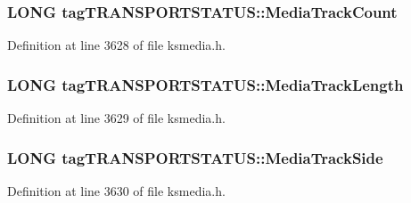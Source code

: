 \subsubsection[{\texorpdfstring{Media\+Track\+Count}{MediaTrackCount}}]{\setlength{\rightskip}{0pt plus 5cm}L\+O\+NG tag\+T\+R\+A\+N\+S\+P\+O\+R\+T\+S\+T\+A\+T\+U\+S\+::\+Media\+Track\+Count}\hypertarget{structtag_t_r_a_n_s_p_o_r_t_s_t_a_t_u_s_a3256dbe815e58cd3805b3ecf5bede2f3}{}\label{structtag_t_r_a_n_s_p_o_r_t_s_t_a_t_u_s_a3256dbe815e58cd3805b3ecf5bede2f3}


Definition at line 3628 of file ksmedia.\+h.

\subsubsection[{\texorpdfstring{Media\+Track\+Length}{MediaTrackLength}}]{\setlength{\rightskip}{0pt plus 5cm}L\+O\+NG tag\+T\+R\+A\+N\+S\+P\+O\+R\+T\+S\+T\+A\+T\+U\+S\+::\+Media\+Track\+Length}\hypertarget{structtag_t_r_a_n_s_p_o_r_t_s_t_a_t_u_s_acc8819cdbee10a300a4702b1578f494f}{}\label{structtag_t_r_a_n_s_p_o_r_t_s_t_a_t_u_s_acc8819cdbee10a300a4702b1578f494f}


Definition at line 3629 of file ksmedia.\+h.

\subsubsection[{\texorpdfstring{Media\+Track\+Side}{MediaTrackSide}}]{\setlength{\rightskip}{0pt plus 5cm}L\+O\+NG tag\+T\+R\+A\+N\+S\+P\+O\+R\+T\+S\+T\+A\+T\+U\+S\+::\+Media\+Track\+Side}\hypertarget{structtag_t_r_a_n_s_p_o_r_t_s_t_a_t_u_s_a81f5247b861b2e68f109b36a3e85dac4}{}\label{structtag_t_r_a_n_s_p_o_r_t_s_t_a_t_u_s_a81f5247b861b2e68f109b36a3e85dac4}


Definition at line 3630 of file ksmedia.\+h.

